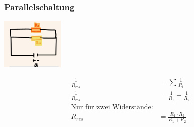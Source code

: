     \subsubsection*{Parallelschaltung}
    \vspace{-1mm}
    \begin{minipage}{0.49\linewidth}
        \begin{footnotesize}
            \begin{center}
                \vspace{2mm}
                \includegraphics[width = 30mm]{src/images/parallelschaltung.png}
            \end{center}
        \end{footnotesize}
    \end{minipage}
    \begin{minipage}{0.5\linewidth}
        \begin{scriptsize}
            \begin{center}
                \begin{align*}
                    \frac{1}{R_{res}} &= \sum \frac{1}{R_i}
                    \\\frac{1}{R_{res}} &= \frac{1}{R_1} +\frac{1}{R_2}
                    \\\text{Nur für zwei Widerstände:}
                    \\R_{res} &= \frac{R_1 \cdot R_2}{R_1 + R_2}
                \end{align*}
            \end{center}
        \end{scriptsize}
    \end{minipage}
    \vspace{1mm}  